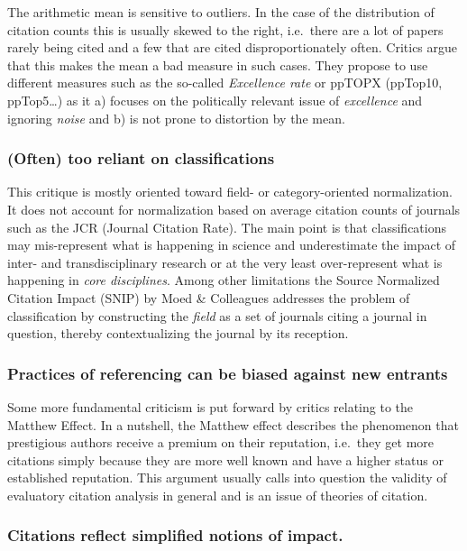 \documentclass[
  letterpaper,
]{scrreprt}
\begin{document}
The arithmetic mean is sensitive to outliers. In the case of the
distribution of citation counts this is usually skewed to the right,
i.e.~there are a lot of papers rarely being cited and a few that are
cited disproportionately often. Critics argue that this makes the mean a
bad measure in such cases. They propose to use different measures such
as the so-called \emph{Excellence rate} or ppTOPX (ppTop10,
ppTop5\ldots) as it a) focuses on the politically relevant issue of
\emph{excellence} and ignoring \emph{noise} and b) is not prone to
distortion by the mean.

\subsubsection{(Often) too reliant on
classifications}\label{often-too-reliant-on-classifications}

This critique is mostly oriented toward field- or category-oriented
normalization. It does not account for normalization based on average
citation counts of journals such as the JCR (Journal Citation Rate). The
main point is that classifications may mis-represent what is happening
in science and underestimate the impact of inter- and transdisciplinary
research or at the very least over-represent what is happening in
\emph{core disciplines}. Among other limitations the Source Normalized
Citation Impact (SNIP) by Moed \& Colleagues addresses the problem of
classification by constructing the \emph{field} as a set of journals
citing a journal in question, thereby contextualizing the journal by its
reception.

\subsubsection{Practices of referencing can be biased against new
entrants}\label{practices-of-referencing-can-be-biased-against-new-entrants}

Some more fundamental criticism is put forward by critics relating to
the Matthew Effect. In a nutshell, the Matthew effect describes the
phenomenon that prestigious authors receive a premium on their
reputation, i.e.~they get more citations simply because they are more
well known and have a higher status or established reputation. This
argument usually calls into question the validity of evaluatory citation
analysis in general and is an issue of theories of citation.

\subsubsection{Citations reflect simplified notions of
impact.}\label{citations-reflect-simplified-notions-of-impact.}
\end{document}
